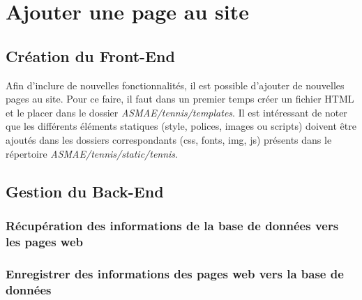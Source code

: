 \chapter{Ajouter une page au site}

\section{Création du Front-End}
Afin d'inclure de nouvelles fonctionnalités, il est possible d'ajouter de nouvelles pages au site. Pour ce faire, il faut dans un premier temps créer un fichier HTML et le placer dans le dossier \textit{ASMAE/tennis/templates}. Il est intéressant de noter que les différents éléments statiques (style, polices, images ou scripts) doivent être ajoutés dans les dossiers correspondants (css, fonts, img, js)  présents dans le répertoire \textit{ASMAE/tennis/static/tennis}.\\






\section{Gestion du Back-End}

\subsection{Récupération des informations de la base de données vers les pages web}

\subsection{Enregistrer des informations des pages web vers la base de données}